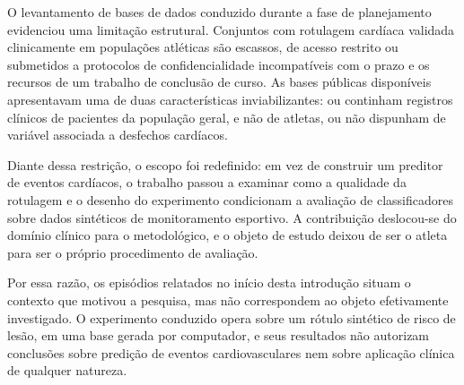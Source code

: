 O levantamento de bases de dados conduzido durante a fase de planejamento evidenciou uma limitação estrutural. Conjuntos com rotulagem cardíaca validada clinicamente em populações atléticas são escassos, de acesso restrito ou submetidos a protocolos de confidencialidade incompatíveis com o prazo e os recursos de um trabalho de conclusão de curso. As bases públicas disponíveis apresentavam uma de duas características inviabilizantes: ou continham registros clínicos de pacientes da população geral, e não de atletas, ou não dispunham de variável associada a desfechos cardíacos.

Diante dessa restrição, o escopo foi redefinido: em vez de construir um preditor de eventos cardíacos, o trabalho passou a examinar como a qualidade da rotulagem e o desenho do experimento condicionam a avaliação de classificadores sobre dados sintéticos de monitoramento esportivo. A contribuição deslocou-se do domínio clínico para o metodológico, e o objeto de estudo deixou de ser o atleta para ser o próprio procedimento de avaliação.

Por essa razão, os episódios relatados no início desta introdução situam o contexto que motivou a pesquisa, mas não correspondem ao objeto efetivamente investigado. O experimento conduzido opera sobre um rótulo sintético de risco de lesão, em uma base gerada por computador, e seus resultados não autorizam conclusões sobre predição de eventos cardiovasculares nem sobre aplicação clínica de qualquer natureza.

